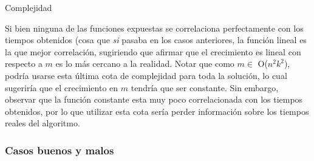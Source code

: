 \begin{subsection}{Complejidad}

Si bien ninguna de las funciones expuestas se correlaciona perfectamente con los tiempos obtenidos (cosa que \textit{si} pasaba en los casos anteriores, la función lineal es la que mejor correlación, sugiriendo que afirmar que el crecimiento es lineal con respecto a $m$ es lo más cercano a la realidad. Notar que como $m \in $ O($n^2k^2$), podría usarse esta última cota de complejidad para toda la solución, lo cual sugeriría que el crecimiento en $m$ tendría que ser constante. Sin embargo, observar que la función constante esta muy poco correlacionada con los tiempos obtenidos, por lo que utilizar esta cota sería perder información sobre los tiempos reales del algoritmo. 


\subsubsection{Casos buenos y malos}


\end{subsection}
